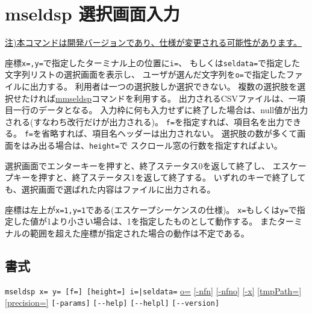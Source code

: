 
%

\section{mseldsp 選択画面入力\label{sect:mseldsp}}
\underline{注)本コマンドは開発バージョンであり、仕様が変更される可能性があります。}

座標\verb|x=,y=|で指定したターミナル上の位置に\verb|i=|、
もしくは\verb|seldata=|で指定した文字列リストの選択画面を表示し、
ユーザが選んだ文字列を\verb|o=|で指定したファイルに出力する。
利用者は一つの選択肢しか選択できない。
複数の選択肢を選択せたければ\hyperref[sect:mmseldsp]{mmseldsp}コマンドを利用する。
出力されるCSVファイルは、一項目一行のデータとなる。
入力枠に何も入力せずに終了した場合は、null値が出力される(すなわち改行だけが出力される)。
\verb|f=|を指定すれば、項目名を出力できる。
\verb|f=|を省略すれば、項目名ヘッダーは出力されない。
選択肢の数が多くて画面をはみ出る場合は、\verb|height=|で
スクロール窓の行数を指定すればよい。

選択画面でエンターキーを押すと、終了ステータス0を返して終了し、
エスケープキーを押すと、終了ステータス1を返して終了する。
いずれのキーで終了しても、選択画面で選ばれた内容はファイルに出力される。

座標は左上が\verb|x=1,y=1|である(エスケープシーケンスの仕様)。
\verb|x=|もしくは\verb|y=|で指定した値が1より小さい場合は、1を指定したものとして動作する。
またターミナルの範囲を超えた座標が指定された場合の動作は不定である。


\subsection*{書式}
\verb/mseldsp x= y= [f=] [height=] i=|seldata=/
\hyperref[sect:option_o]{o=}
\hyperref[sect:option_nfn]{[-nfn]} 
\hyperref[sect:option_nfno]{[-nfno]}  
\hyperref[sect:option_x]{[-x]}
\hyperref[sect:option_option_tmppath]{[tmpPath=]}
\hyperref[sect:option_precision]{[precision=]}
\verb|[-params]|
\verb|[--help]|
\verb|[--helpl]|
\verb|[--version]|\\


